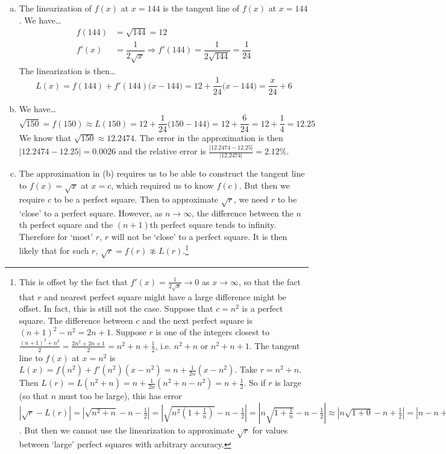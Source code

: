 \documentclass[11pt,letterpaper]{article}
\begin{document}
\sol 
\begin{enumerate}[(a)]
\item The linearization of $f(x)$ at $x= 144$ is the tangent line of $f(x)$ at $x= 144$. We have\dots
	\[
	\begin{aligned}
	f(144)&= \sqrt{144}= 12 \\[0.3cm]
	f'(x)&= \dfrac{1}{2\sqrt{x}} \Rightarrow f'(144)= \dfrac{1}{2 \sqrt{144}}= \dfrac{1}{24}
	\end{aligned}
	\]
The linearization is then\dots
	\[
	L(x)= f(144) + f'(144) \big(x - 144\big)= 12 + \dfrac{1}{24} \big(x - 144\big)= \dfrac{x}{24} + 6
	\] 

\item We have\dots
	\[
	\sqrt{150}= f(150) \approx L(150)= 12 + \dfrac{1}{24} \big(150 - 144 \big)= 12 + \dfrac{6}{24}= 12 + \dfrac{1}{4}= 12.25
	\]
We know that $\sqrt{150} \approx 12.2474$. The error in the approximation is then $|12.2474 - 12.25|= 0.0026$ and the relative error is $\frac{|12.2474 - 12.25|}{|12.2474|}= 2.12\%$. 

\item The approximation in (b) requires us to be able to construct the tangent line to $f(x)= \sqrt{x}$ at $x= c$, which required us to know $f(c)$. But then we require $c$ to be a perfect square. Then to approximate $\sqrt{r}$, we need $r$ to be `close' to a perfect square. However, as $n \to \infty$, the difference between the $n$th perfect square and the $(n+1)$th perfect square tends to infinity. Therefore for `most' $r$, $r$ will not be `close' to a perfect square. It is then likely that for such $r$, $\sqrt{r} = f(r) \not\approx L(r)$.\footnote{This is offset by the fact that $f'(x)= \frac{1}{2\sqrt{x}} \to 0$ as $x \to \infty$, so that the fact that $r$ and nearest perfect square might have a large difference might be offset. In fact, this is still not the case. Suppose that $c= n^2$ is a perfect square. The difference between $c$ and the next perfect square is $(n + 1)^2 - n^2= 2n + 1$. Suppose $r$ is one of the integers closest to $\frac{(n + 1)^2 + n^2}{2}= \frac{2n^2 + 2n + 1}{2}= n^2 + n + \frac{1}{2}$, i.e. $n^2 + n$ or $n^2 + n + 1$. The tangent line to $f(x)$ at $x= n^2$ is $L(x)= f(n^2) + f'(n^2) (x - n^2)= n + \frac{1}{2n} (x - n^2)$. Take $r= n^2 + n$. Then $L(r)= L(n^2 + n)= n + \frac{1}{2n} (n^2 + n - n^2)= n + \frac{1}{2}$. So if $r$ is large (so that $n$ must too be large), this has error $|\sqrt{r} - L(r)|= |\sqrt{n^2 + n} - n - \frac{1}{2}|= |\sqrt{n^2(1 + \frac{1}{n})} - n - \frac{1}{2}|= |n \sqrt{1 + \frac{1}{n}} - n - \frac{1}{2}| \approx |n \sqrt{1 + 0} - n + \frac{1}{2}|= |n - n + \frac{1}{2}|= \frac{1}{2}$. But then we cannot use the linearization to approximate $\sqrt{r}$ for values between `large' perfect squares with arbitrary accuracy.}
\end{enumerate}
\end{document}
